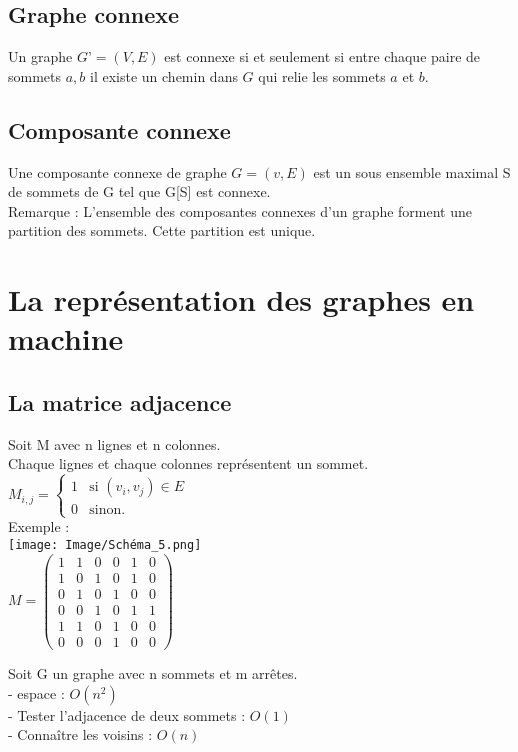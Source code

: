 \documentclass{article}
\begin{document}
{\newpage
\subsection{Graphe connexe}
Un graphe $G’=(V,E)$ est connexe si et seulement si entre chaque paire de sommets $a,b$ il existe un chemin dans $G$ qui relie les sommets $a$ et $b$.

\subsection{Composante connexe}
Une composante connexe de graphe $G=(v,E)$ est un sous ensemble maximal S de sommets de G tel que G[S] est connexe. \\
Remarque : L’ensemble des composantes connexes d’un graphe forment une partition des sommets. Cette partition est unique.

\section{La représentation des graphes en machine}
\subsection{La matrice adjacence}
Soit M avec n lignes et n colonnes. \\
Chaque lignes et chaque colonnes représentent un sommet. \\
$ M_{i,j}=\left\{\begin{array}{rl}

	1 & \mbox{si } (v_i,v_j)\in E \\

        0 & \mbox{sinon.}

\end{array}\right. $
\\
Exemple : \\
\texttt{[image: Image/Schéma\_5.png]}
\\
$M=\begin{pmatrix}
1 & 1 & 0 & 0 & 1 & 0\\
1 & 0 & 1 & 0 & 1 & 0\\
0 & 1 & 0 & 1 & 0 & 0\\
0 & 0 & 1 & 0 & 1 & 1\\
1 & 1 & 0 & 1 & 0 & 0\\
0 & 0 & 0 & 1 & 0 & 0
\end{pmatrix} $

\newpage
Soit G un graphe avec n sommets et m arrêtes. \\
- espace : $O(n^2)$ \\
- Tester l’adjacence de deux sommets : $O(1)$ \\
- Connaître les voisins : $O(n)$ \\
\\

}
\end{document}
